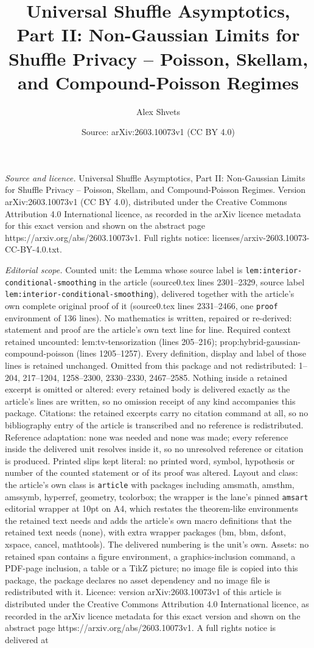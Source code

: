 \documentclass[10pt,a4paper]{amsart}
\title[Universal Shuffle Asymptotics, Part II: Non-Gaussian Limits ]{Universal Shuffle Asymptotics, Part II: Non-Gaussian Limits for Shuffle Privacy -- Poisson, Skellam, and Compound-Poisson Regimes}
\author{Alex Shvets}
\date{Source: arXiv:2603.10073v1 (CC BY 4.0)}
\begin{document}
\maketitle

\noindent\emph{Source and licence.} Universal Shuffle Asymptotics, Part II: Non-Gaussian Limits for Shuffle Privacy -- Poisson, Skellam, and Compound-Poisson Regimes. Version arXiv:2603.10073v1 (CC BY 4.0), distributed under the Creative Commons Attribution 4.0 International licence, as recorded in the arXiv licence metadata for this exact version and shown on the abstract page https://arxiv.org/abs/2603.10073v1. Full rights notice: licenses/arxiv-2603.10073-CC-BY-4.0.txt.\par\smallskip

\noindent\textit{Editorial scope.} Counted unit: the Lemma whose source label is \texttt{lem:interior-conditional-smoothing} in the article (source0.tex lines 2301--2329, source label \texttt{lem:interior-conditional-smoothing}), delivered together with the article's own complete original proof of it (source0.tex lines 2331--2466, one \texttt{proof} environment of 136 lines). No mathematics is written, repaired or re-derived: statement and proof are the article's own text line for line. Required context retained uncounted: lem:tv-tensorization (lines 205--216); prop:hybrid-gaussian-compound-poisson (lines 1205--1257). Every definition, display and label of those lines is retained unchanged. Omitted from this package and not redistributed: 1--204, 217--1204, 1258--2300, 2330--2330, 2467--2585. Nothing inside a retained excerpt is omitted or altered: every retained body is delivered exactly as the article's lines are written, so no omission receipt of any kind accompanies this package. Citations: the retained excerpts carry no citation command at all, so no bibliography entry of the article is transcribed and no reference is redistributed. Reference adaptation: none was needed and none was made; every reference inside the delivered unit resolves inside it, so no unresolved reference or citation is produced. Printed slips kept literal: no printed word, symbol, hypothesis or number of the counted statement or of its proof was altered. Layout and class: the article's own class is \texttt{article} with packages including amsmath, amsthm, amssymb, hyperref, geometry, tcolorbox; the wrapper is the lane's pinned \texttt{amsart} editorial wrapper at 10pt on A4, which restates the theorem-like environments the retained text needs and adds the article's own macro definitions that the retained text needs (none), with extra wrapper packages (bm, bbm, dsfont, xspace, cancel, mathtools). The delivered numbering is the unit's own. Assets: no retained span contains a figure environment, a graphics-inclusion command, a PDF-page inclusion, a table or a TikZ picture; no image file is copied into this package, the package declares no asset dependency and no image file is redistributed with it. Licence: version arXiv:2603.10073v1 of this article is distributed under the Creative Commons Attribution 4.0 International licence, as recorded in the arXiv licence metadata for this exact version and shown on the abstract page https://arxiv.org/abs/2603.10073v1. A full rights notice is delivered at 
\end{document}
